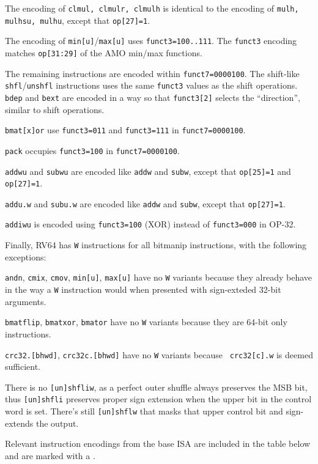 The encoding of {\tt clmul, clmulr, clmulh} is identical to the encoding of
{\tt mulh, mulhsu, mulhu}, except that {\tt op[27]=1}.

The encoding of {\tt min[u]}/{\tt max[u]} uses {\tt funct3=100..111}. The
{\tt funct3} encoding matches {\tt op[31:29]} of the AMO min/max functions.

The remaining instructions are encoded within {\tt funct7=0000100}. The
shift-like {\tt shfl}/{\tt unshfl} instructions uses the same {\tt funct3}
values as the shift operations. {\tt bdep} and {\tt bext} are encoded in a
way so that {\tt funct3[2]} selects the ``direction'', similar to shift
operations.

{\tt bmat[x]or} use {\tt funct3=011} and {\tt funct3=111} in {\tt funct7=0000100}.

{\tt pack} occupies {\tt funct3=100} in {\tt funct7=0000100}.

{\tt addwu} and {\tt subwu} are encoded like {\tt addw} and {\tt subw}, except
that {\tt op[25]=1} and {\tt op[27]=1}.

{\tt addu.w} and {\tt subu.w} are encoded like {\tt addw} and {\tt subw}, except
that {\tt op[27]=1}.

{\tt addiwu} is encoded using {\tt funct3=100} (XOR) instead of {\tt funct3=000} in OP-32.

Finally, RV64 has {\tt *W} instructions for all bitmanip instructions, with the
following exceptions:

{\tt andn}, {\tt cmix}, {\tt cmov}, {\tt min[u]}, {\tt max[u]} have no {\tt *W}
variants because they already behave in the way a {\tt *W} instruction would
when presented with sign-exteded 32-bit arguments.

{\tt bmatflip}, {\tt bmatxor}, {\tt bmator} have no {\tt *W} variants because
they are 64-bit only instructions.

{\tt crc32.[bhwd]}, {\tt crc32c.[bhwd]} have no {\tt *W} variants because {\tt
crc32[c].w} is deemed sufficient.

There is no {\tt [un]shfliw}, as a perfect outer shuffle always preserves the
MSB bit, thus {\tt [un]shfli} preserves proper sign extension when the
upper bit in the control word is set. There's still {\tt [un]shflw} that
masks that upper control bit and sign-extends the output.

Relevant instruction encodings from the base ISA are included in the table below
and are marked with a {\tt *}.



